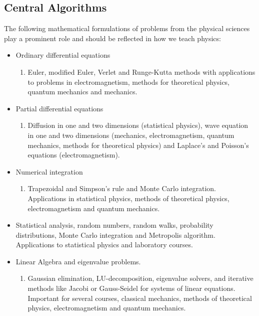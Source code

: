 \documentclass[graybox,envcountchap,sectrefs]{svmult}
\begin{document}
\subsection{Central Algorithms}
The following mathematical formulations of problems from the physical sciences play a prominent role and should be reflected in how we teach physics:
\begin{itemize}
\item Ordinary differential equations
\begin{enumerate}

  \item Euler, modified Euler, Verlet and Runge-Kutta methods with applications to problems in electromagnetism, methods for theoretical physics, quantum mechanics and mechanics.

\end{enumerate}


\item Partial differential equations
\begin{enumerate}

  \item Diffusion in one and two dimensions (statistical physics), wave equation in one and two dimensions (mechanics, electromagnetism, quantum mechanics, methods for theoretical physics) and Laplace's and Poisson's equations (electromagnetism).

\end{enumerate}


\item Numerical integration
\begin{enumerate}

  \item Trapezoidal and Simpson's rule and Monte Carlo integration. Applications in statistical physics, methods of theoretical physics, electromagnetism and quantum mechanics.

\end{enumerate}


\item Statistical analysis, random numbers, random walks, probability distributions, Monte Carlo integration and Metropolis algorithm. Applications to statistical physics and laboratory courses.

\item Linear Algebra and eigenvalue problems.
\begin{enumerate}

  \item Gaussian elimination, LU-decomposition, eigenvalue solvers, and iterative methods like  Jacobi or Gauss-Seidel for systems of linear equations. Important for several courses, classical mechanics, methods of theoretical physics, electromagnetism and quantum mechanics.


\end{enumerate}
\end{itemize}
\end{document}
